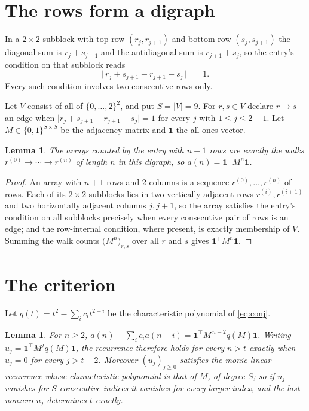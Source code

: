 \documentclass[11pt,a4paper]{article}
\theoremstyle{plain}
\newtheorem{lemma}[theorem]{Lemma}
\theoremstyle{definition}
\begin{document}
\section{The rows form a digraph}

In a $2\times2$ subblock with top row $(r_j,r_{j+1})$ and bottom row $(s_j,s_{j+1})$ the
diagonal sum is $r_j+s_{j+1}$ and the antidiagonal sum is $r_{j+1}+s_j$, so the entry's
condition on that subblock reads
\[
\bigl|\,r_j+s_{j+1}-r_{j+1}-s_j\,\bigr|\;=\;1.
\]
Every such condition involves two consecutive rows only.

Let $V$ consist of all of $\{0,\dots,2\}^{2}$, and put $S=|V|=9$. For $r,s\in V$ declare $r\to s$ an edge
when $\bigl|r_j+s_{j+1}-r_{j+1}-s_j\bigr|=1$ for every $j$ with
$1\le j\le2-1$. Let $M\in\{0,1\}^{S\times S}$ be the adjacency matrix and $\mathbf{1}$
the all-ones vector.

\begin{lemma}\label{lem:walk}
The arrays counted by the entry with $n+1$ rows are exactly the walks
$r^{(0)}\to\cdots\to r^{(n)}$ of length $n$ in this digraph, so
$a(n)=\mathbf{1}^{\!\top}M^{n}\mathbf{1}$.
\end{lemma}

\begin{proof}
An array with $n+1$ rows and $2$ columns is a sequence $r^{(0)},\dots,r^{(n)}$ of
rows. Each of its $2\times2$ subblocks lies in two vertically adjacent rows
$r^{(i)},r^{(i+1)}$ and two horizontally adjacent columns $j,j+1$, so the array satisfies
the entry's condition on all subblocks precisely when every consecutive pair of rows is an
edge; and the row-internal condition, where present, is exactly membership of $V$. Summing
the walk counts $\bigl(M^{n}\bigr)_{r,s}$ over all $r$ and $s$ gives
$\mathbf{1}^{\!\top}M^{n}\mathbf{1}$.
\end{proof}

\section{The criterion}

Let $q(t)=t^{2}-\sum_i c_i t^{2-i}$ be the characteristic polynomial of
\eqref{eq:conj}.

\begin{lemma}\label{lem:crit}
For $n\ge2$,
$a(n)-\sum_i c_i a(n-i)=\mathbf{1}^{\!\top}M^{\,n-2}q(M)\mathbf{1}$. Writing
$u_j=\mathbf{1}^{\!\top}M^{j}q(M)\mathbf{1}$, the recurrence therefore holds for every
$n>t$ exactly when $u_j=0$ for every $j>t-2$. Moreover $(u_j)_{j\ge0}$ satisfies the
monic linear recurrence whose characteristic polynomial is that of $M$, of degree $S$; so
if $u_j$ vanishes for $S$ consecutive indices it vanishes for every larger index, and the
last nonzero $u_j$ determines $t$ exactly.
\end{lemma}
\end{document}
